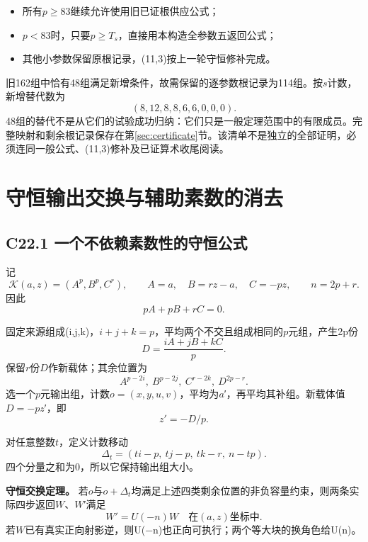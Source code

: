 \documentclass[11pt,a4paper]{article}
\newcommand{\tightlist}{\setlength{\itemsep}{0pt}\setlength{\parskip}{0pt}}
\theoremstyle{definition}
\numberwithin{equation}{section}
\begin{document}
\begin{itemize}
\tightlist
\item
  {所有\ensuremath{p}\ensuremath{\ge}83继续允许使用旧已证根供应公式；}
\item
  {\ensuremath{p<83}时，只要\ensuremath{p}\ensuremath{\ge}\ensuremath{T_{s}}，直接用本构造全参数五返回公式；}
\item
  {其他小参数保留原根记录，(11,3)按上一轮守恒修补完成。}
\end{itemize}

{旧162组中恰有48组满足新增条件，故需保留的逐参数根记录为114组。按\ensuremath{s}计数，新增替代数为} \[
(8,12,8,8,6,6,0,0,0).
\] {48组的替代不是从它们的试验成功归纳：它们只是一般定理范围中的有限成员。完整映射和剩余根记录保存在}第\ref{sec:certificate}节{。该清单不是独立的全部证明，必须连同一般公式、(11,3)修补及已证算术收尾阅读。}


\section{守恒输出交换与辅助素数的消去}\label{construct:conservation}
\subsection*{\texorpdfstring{{C22.1} {一个不依赖素数性的守恒公式}}{C22.1 一个不依赖素数性的守恒公式}}\label{C22-h146}

{记} \[
\mathcal K(a,z)=(A^p,B^p,C^r),\qquad
A=a,\quad B=rz-a,\quad C=-pz,\qquad n=2p+r.
\] {因此} \[
pA+pB+rC=0.
\tag{C22.1.1}
\]

{固定来源组成(i,j,k)，\ensuremath{i+j+k=p}，平均两个不交且组成相同的\ensuremath{p}元组，产生2p份} \[
D=\frac{iA+jB+kC}{p}.
\] {保留\ensuremath{r}份\ensuremath{D}作新载体；其余位置为} \[
A^{p-2i},\ B^{p-2j},\ C^{r-2k},\ D^{2p-r}.
\] {选一个\ensuremath{p}元输出组，计数\ensuremath{o=(x,y,u,v)}，平均为\ensuremath{a}′，再平均其补组。新载体值\ensuremath{D=-pz}′，即} \[
z'=-D/p.
\]

{对任意整数\ensuremath{t}，定义计数移动} \[
\boxed{
\Delta_t=(ti-p,\ tj-p,\ tk-r,\ n-tp).
}
\tag{C22.1.2}
\] {四个分量之和为0，所以它保持输出组大小。}

\textbf{{守恒交换定理。}} {若\ensuremath{o}与\ensuremath{o+\Delta _{t}}均满足上述四类剩余位置的非负容量约束，则两条实际四步返回\ensuremath{W}、\ensuremath{W}′满足} \[
\boxed{W'=U(-n)W\quad\text{在}(a,z)\text{坐标中}.}
\tag{C22.1.3}
\] {若\ensuremath{W}已有真实正向射影逆，则U(−n)也正向可执行；两个等大块的换角色给U(n)。}
\end{document}
